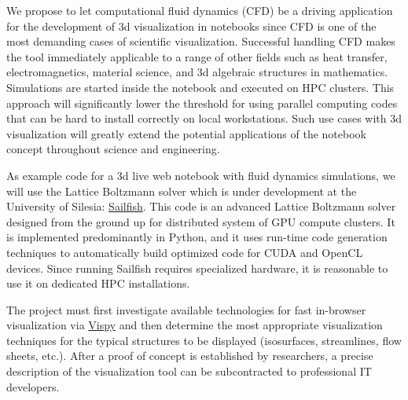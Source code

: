 \begin{workpackage}
\begin{tasklist}
\begin{task}[title=Visualization system for 3d data in web-notebook
, id=cfd-vis]
We propose to let computational fluid dynamics (CFD) be a driving
application for the development of 3d visualization in \Jupyter
notebooks since CFD is one of the most demanding cases of scientific
visualization. Successful handling CFD makes the tool immediately
applicable to a range of other fields such as heat transfer,
electromagnetics, material science, and 3d algebraic structures in
mathematics. Simulations are started inside the notebook and executed
on HPC clusters. This approach will significantly lower the threshold
for using parallel computing codes that can be hard to install
correctly on local workstations. Such use cases with 3d visualization
will greatly extend the potential applications of the \Jupyter
notebook concept throughout science and engineering.

As example code for a 3d live web notebook with fluid dynamics
simulations, we will use the Lattice Boltzmann solver which is under
development at the University of Silesia:
\href{http://sailfish.us.edu.pl/}{Sailfish}.  This code is an advanced
Lattice Boltzmann solver designed from the ground up for distributed
system of GPU compute clusters. It is implemented predominantly in
Python, and it uses run-time code generation techniques to
automatically build optimized code for CUDA and OpenCL devices. Since
running Sailfish requires specialized hardware, it is reasonable to
use it on dedicated HPC installations.

The project must first investigate available technologies for fast
in-browser visualization via \href{http://vispy.org}{Vispy} and then
determine the most appropriate visualization techniques for the
typical structures to be displayed (isosurfaces, streamlines, flow
sheets, etc.).  After a proof of concept is established by
researchers, a precise description of the visualization tool can be
subcontracted to professional IT developers.
\end{task}


\begin{task}[id=mws,title=Math Search Engine,lead=JU,PM=10]
\end{task}


\end{tasklist}
\end{workpackage}
